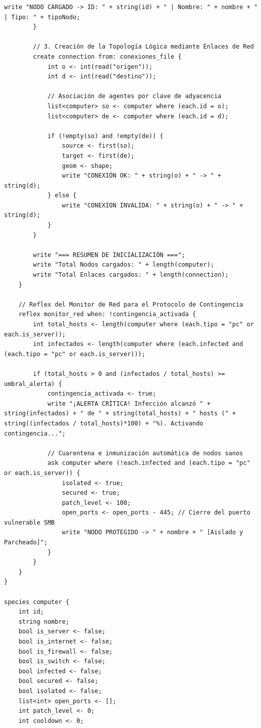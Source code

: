 \documentclass{ieeeaccess}
\begin{document}
\begin{lstlisting}[caption={InfeccionRedes.gaml - Código fuente de la simulación en GAMA Platform}, label={list:gaml_code}]
            write "NODO CARGADO -> ID: " + string(id) + " | Nombre: " + nombre + " | Tipo: " + tipoNodo;
        }
        
        // 3. Creación de la Topología Lógica mediante Enlaces de Red
        create connection from: conexiones_file {
            int o <- int(read("origen"));
            int d <- int(read("destino"));
            
            // Asociación de agentes por clave de adyacencia
            list<computer> so <- computer where (each.id = o);
            list<computer> de <- computer where (each.id = d);
            
            if (!empty(so) and !empty(de)) {
                source <- first(so);
                target <- first(de);
                geom <- shape;
                write "CONEXIÓN OK: " + string(o) + " -> " + string(d);
            } else {
                write "CONEXION INVALIDA: " + string(o) + " -> " + string(d);
            }
        }
        
        write "=== RESUMEN DE INICIALIZACIÓN ===";
        write "Total Nodos cargados: " + length(computer);
        write "Total Enlaces cargados: " + length(connection);
    }
    
    // Reflex del Monitor de Red para el Protocolo de Contingencia
    reflex monitor_red when: !contingencia_activada {
        int total_hosts <- length(computer where (each.tipo = "pc" or each.is_server));
        int infectados <- length(computer where (each.infected and (each.tipo = "pc" or each.is_server)));
        
        if (total_hosts > 0 and (infectados / total_hosts) >= umbral_alerta) {
            contingencia_activada <- true;
            write "¡ALERTA CRÍTICA! Infección alcanzó " + string(infectados) + " de " + string(total_hosts) + " hosts (" + string((infectados / total_hosts)*100) + "%). Activando contingencia...";
            
            // Cuarentena e inmunización automática de nodos sanos
            ask computer where (!each.infected and (each.tipo = "pc" or each.is_server)) {
                isolated <- true;
                secured <- true;
                patch_level <- 100;
                open_ports <- open_ports - 445; // Cierre del puerto vulnerable SMB
                write "NODO PROTEGIDO -> " + nombre + " [Aislado y Parcheado]";
            }
        }
    }
}

species computer {
    int id;
    string nombre;
    bool is_server <- false;
    bool is_internet <- false;
    bool is_firewall <- false;
    bool is_switch <- false;
    bool infected <- false;
    bool secured <- false;
    bool isolated <- false;
    list<int> open_ports <- [];
    int patch_level <- 0;
    int cooldown <- 0;
    

\end{lstlisting}
\end{document}
